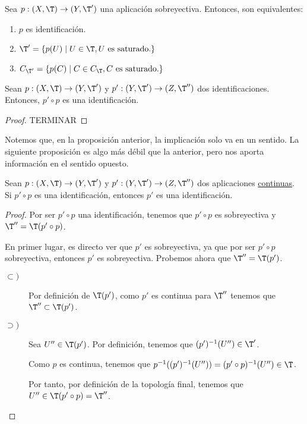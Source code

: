 \begin{coro}
    Sea $p:(X,\T)\to (Y,\T')$ una aplicación sobreyectiva. Entonces, son equivalentes:
    \begin{enumerate}
        \item $p$ es identificación.
        \item $\T' = \{p(U)\mid U\in \T, U \text{ es saturado.}\}$
        \item $C_{\T'}= \{p(C)\mid C\in C_{\T}, C \text{ es saturado.}\}$
    \end{enumerate}
\end{coro}


\begin{prop}
    Sean $p:(X,\T)\to (Y,\T')$ y $p':(Y,\T')\to (Z,\T'')$ dos identificaciones. Entonces, $p'\circ p$ es una identificación.
\end{prop}
\begin{proof}
    TERMINAR
\end{proof}

Notemos que, en la proposición anterior, la implicación solo va en un sentido. La siguiente proposición es algo más débil que la anterior, pero nos aporta información en el sentido opuesto.
\begin{prop}
    Sean $p:(X,\T)\to (Y,\T')$ y $p':(Y,\T')\to (Z,\T'')$ dos aplicaciones \ul{continuas}. Si $p'\circ p$ es una identificación, entonces $p'$ es una identificación.
\end{prop}
\begin{proof}
    Por ser $p'\circ p$ una identificación, tenemos que $p'\circ p$ es sobreyectiva y $\T''=\T(p'\circ p)$.
    
    
    En primer lugar, es directo ver que $p'$ es sobreyectiva, ya que por ser $p'\circ p$ sobreyectiva, entonces $p'$ es sobreyectiva. Probemos ahora que $\T''=\T(p')$.
    \begin{description}
        \item[$\subset)$] Por definición de $\T(p')$, como $p'$ es continua para $\T''$ tenemos que $\T''\subset \T(p')$.

        \item[$\supset)$] Sea $U''\in \T(p')$. Por definición, tenemos que $(p')^{-1}(U'')\in \T'$.

        Como $p$ es continua, tenemos que $p^{-1}((p')^{-1}(U''))= (p'\circ p)^{-1}(U'')\in \T$.

        Por tanto, por definición de la topología final, tenemos que $U''\in \T(p'\circ p)=\T''$.
    \end{description}
\end{proof}


